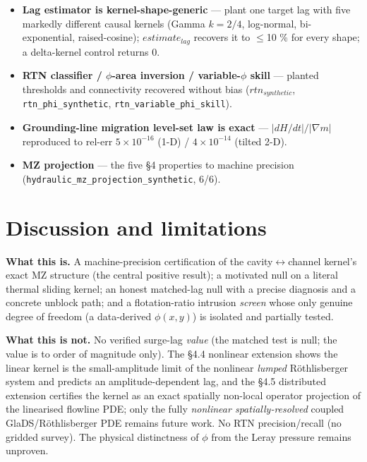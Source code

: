 \documentclass[tc, manuscript]{copernicus}
\begin{document}
\begin{itemize}
\item \textbf{Lag estimator is kernel-shape-generic} — plant one target lag with five markedly different causal kernels (Gamma $k=2/4$, log-normal, bi-exponential, raised-cosine); $estimate_{lag}$ recovers it to \ensuremath{\le}10 \% for every shape; a delta-kernel control returns 0.
\item \textbf{RTN classifier / $\phi $-area inversion / variable-$\phi $ skill} — planted thresholds and connectivity recovered without bias ($rtn_{synthetic}$, \texttt{rtn\_\allowbreak{}phi\_\allowbreak{}synthetic}, \texttt{rtn\_\allowbreak{}variable\_\allowbreak{}phi\_\allowbreak{}skill}).
\item \textbf{Grounding-line migration level-set law is exact} — $|dH/dt|/|\nabla m|$ reproduced to rel-err $5\times 10^{-16}$ (1-D) / $4\times 10^{-14}$ (tilted 2-D).
\item \textbf{MZ projection} — the five §4 properties to machine precision (\texttt{hydraulic\_\allowbreak{}mz\_\allowbreak{}projection\_\allowbreak{}synthetic}, 6/6).
\end{itemize}

\section{Discussion and limitations}

\textbf{What this is.} A machine-precision certification of the cavity\ensuremath{\leftrightarrow}channel kernel's exact MZ structure (the central positive result); a motivated null on a literal thermal sliding kernel; an honest matched-lag null with a precise diagnosis and a concrete unblock path; and a flotation-ratio intrusion \emph{screen} whose only genuine degree of freedom (a data-derived $\phi (x,y)$) is isolated and partially tested.

\textbf{What this is not.} No verified surge-lag \emph{value} (the matched test is null; the value is to order of magnitude only). The §4.4 nonlinear extension shows the linear kernel is the small-amplitude limit of the nonlinear \emph{lumped} Röthlisberger system and predicts an amplitude-dependent lag, and the §4.5 distributed extension certifies the kernel as an exact spatially non-local operator projection of the linearised flowline PDE; only the fully \emph{nonlinear spatially-resolved} coupled GlaDS/Röthlisberger PDE remains future work. No RTN precision/recall (no gridded survey). The physical distinctness of $\phi $ from the Leray pressure remains unproven.
\end{document}

